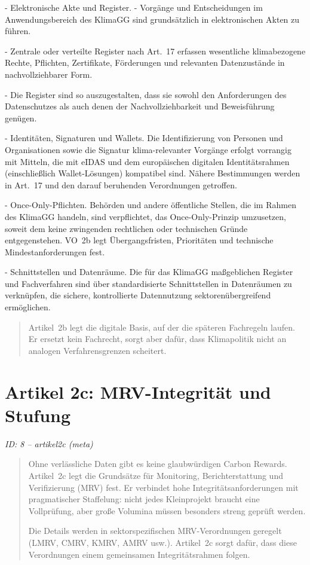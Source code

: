 \documentclass[12pt,a4paper]{scrartcl}
\begin{document}
- Elektronische Akte und Register.
- Vorgänge und Entscheidungen im Anwendungsbereich des KlimaGG sind grundsätzlich in elektronischen Akten zu führen.

- Zentrale oder verteilte Register nach Art. 17 erfassen wesentliche klimabezogene Rechte, Pflichten, Zertifikate, Förderungen und relevanten Datenzustände in nachvollziehbarer Form.

- Die Register sind so auszugestalten, dass sie sowohl den Anforderungen des Datenschutzes als auch denen der Nachvollziehbarkeit und Beweisführung genügen.

- Identitäten, Signaturen und Wallets. Die Identifizierung von Personen und Organisationen sowie die Signatur klima-relevanter Vorgänge erfolgt vorrangig mit Mitteln, die mit eIDAS und dem europäischen digitalen Identitätsrahmen (einschließlich Wallet-Lösungen) kompatibel sind. Nähere Bestimmungen werden in Art. 17 und den darauf beruhenden Verordnungen getroffen.

- Once-Only-Pflichten. Behörden und andere öffentliche Stellen, die im Rahmen des KlimaGG handeln, sind verpflichtet, das Once-Only-Prinzip umzusetzen, soweit dem keine zwingenden rechtlichen oder technischen Gründe entgegenstehen. VO 2b legt Übergangsfristen, Prioritäten und technische Mindestanforderungen fest.

- Schnittstellen und Datenräume. Die für das KlimaGG maßgeblichen Register und Fachverfahren sind über standardisierte Schnittstellen in Datenräumen zu verknüpfen, die sichere, kontrollierte Datennutzung sektorenübergreifend ermöglichen.

{\footnotesize\begin{quote}
Artikel 2b legt die digitale Basis, auf der die späteren Fachregeln laufen. Er ersetzt kein Fachrecht, sorgt aber dafür, dass Klimapolitik nicht an analogen Verfahrensgrenzen scheitert.
\end{quote}}



\section[Artikel 2c: MRV-Integrität und Stufung]{Artikel 2c: MRV-Integrität und Stufung}
\noindent\textit{ID: 8 -- artikel2c (meta)}

\begin{quote}
Ohne verlässliche Daten gibt es keine glaubwürdigen Carbon Rewards. Artikel 2c legt die Grundsätze für Monitoring, Berichterstattung und Verifizierung (MRV) fest. Er verbindet hohe Integritätsanforderungen mit pragmatischer Staffelung: nicht jedes Kleinprojekt braucht eine Vollprüfung, aber große Volumina müssen besonders streng geprüft werden.

Die Details werden in sektorspezifischen MRV-Verordnungen geregelt (LMRV, CMRV, KMRV, AMRV usw.). Artikel 2c sorgt dafür, dass diese Verordnungen einem gemeinsamen Integritätsrahmen folgen.
\end{quote}
\end{document}
